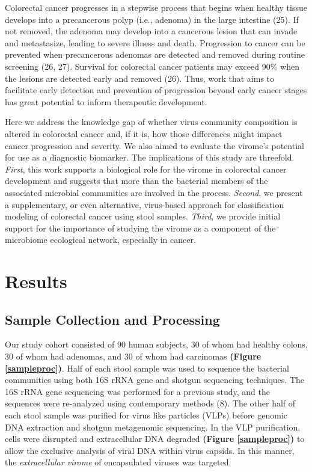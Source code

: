 \documentclass[12pt,]{article}
\begin{document}
Colorectal cancer progresses in a stepwise process that begins when
healthy tissue develops into a precancerous polyp (i.e., adenoma) in the
large intestine (25). If not removed, the adenoma may develop into a
cancerous lesion that can invade and metastasize, leading to severe
illness and death. Progression to cancer can be prevented when
precancerous adenomas are detected and removed during routine screening
(26, 27). Survival for colorectal cancer patients may exceed 90\% when
the lesions are detected early and removed (26). Thus, work that aims to
facilitate early detection and prevention of progression beyond early
cancer stages has great potential to inform therapeutic development.

Here we address the knowledge gap of whether virus community composition
is altered in colorectal cancer and, if it is, how those differences
might impact cancer progression and severity. We also aimed to evaluate
the virome's potential for use as a diagnostic biomarker. The
implications of this study are threefold. \emph{First}, this work
supports a biological role for the virome in colorectal cancer
development and suggests that more than the bacterial members of the
associated microbial communities are involved in the process.
\emph{Second}, we present a supplementary, or even alternative,
virus-based approach for classification modeling of colorectal cancer
using stool samples. \emph{Third}, we provide initial support for the
importance of studying the virome as a component of the microbiome
ecological network, especially in cancer.

\section{Results}\label{results}

\subsection{Sample Collection and
Processing}\label{sample-collection-and-processing}

Our study cohort consisted of 90 human subjects, 30 of whom had healthy
colons, 30 of whom had adenomas, and 30 of whom had carcinomas
\textbf{(Figure \ref{sampleproc})}. Half of each stool sample was used
to sequence the bacterial communities using both 16S rRNA gene and
shotgun sequencing techniques. The 16S rRNA gene sequencing was
performed for a previous study, and the sequences were re-analyzed using
contemporary methods (8). The other half of each stool sample was
purified for virus like particles (VLPs) before genomic DNA extraction
and shotgun metagenomic sequencing. In the VLP purification, cells were
disrupted and extracellular DNA degraded \textbf{(Figure
\ref{sampleproc})} to allow the exclusive analysis of viral DNA within
virus capsids. In this manner, the \emph{extracellular virome} of
encapsulated viruses was targeted.
\end{document}
